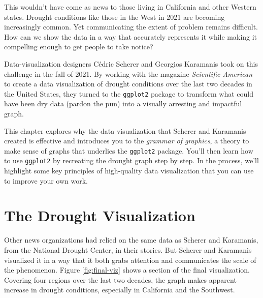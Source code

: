 \documentclass[
]{book}
\begin{document}
This wouldn't have come as news to those living in California and other Western states. Drought conditions like those in the West in 2021 are becoming increasingly common. Yet communicating the extent of problem remains difficult. How can we show the data in a way that accurately represents it while making it compelling enough to get people to take notice?

Data-visualization designers Cédric Scherer and Georgios Karamanis took on this challenge in the fall of 2021. By working with the magazine \emph{Scientific American} to create a data visualization of drought conditions over the last two decades in the United States, they turned to the \texttt{ggplot2} package to transform what could have been dry data (pardon the pun) into a visually arresting and impactful graph.

This chapter explores why the data visualization that Scherer and Karamanis created is effective and introduces you to the \emph{grammar of graphics}, a theory to make sense of graphs that underlies the \texttt{ggplot2} package. You'll then learn how to use \texttt{ggplot2} by recreating the drought graph step by step. In the process, we'll highlight some key principles of high-quality data visualization that you can use to improve your own work.

\hypertarget{the-drought-visualization}{%
\section*{The Drought Visualization}\label{the-drought-visualization}}

Other news organizations had relied on the same data as Scherer and Karamanis, from the National Drought Center, in their stories. But Scherer and Karamanis visualized it in a way that it both grabs attention and communicates the scale of the phenomenon. Figure \ref{fig:final-viz} shows a section of the final visualization. Covering four regions over the last two decades, the graph makes apparent increase in drought conditions, especially in California and the Southwest.
\end{document}
